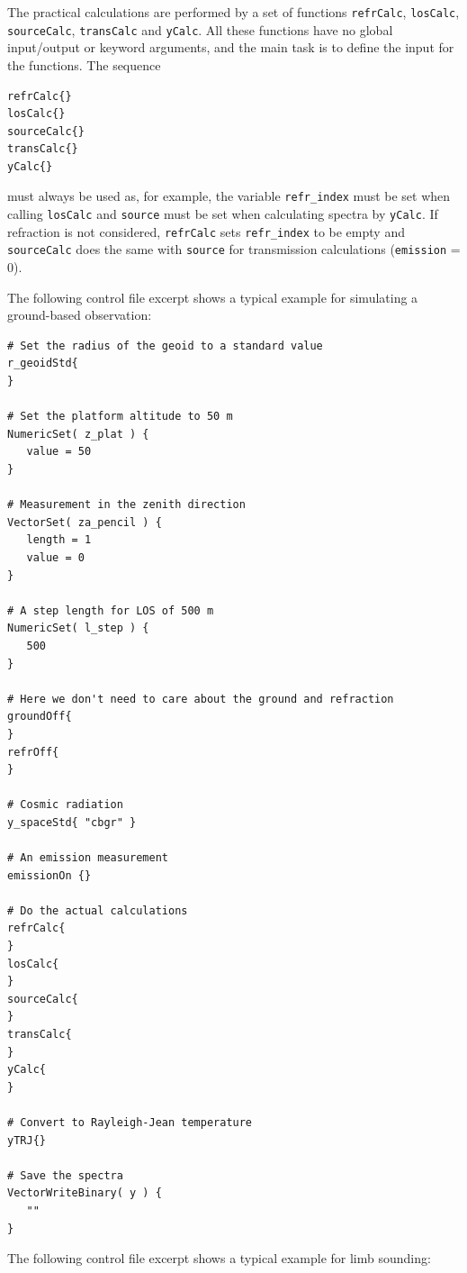  \label{sec:los:cfe}
 
 The practical calculations are performed by a set of functions
 \verb|refrCalc|, \verb|losCalc|, \verb|sourceCalc|, \verb|transCalc|
 and \verb|yCalc|. All these functions have no global input/output or
 keyword arguments, and the main task is to define the input for the
 functions. The sequence {\footnotesize \begin{verbatim}
refrCalc{}
losCalc{}
sourceCalc{}
transCalc{}
yCalc{} 
\end{verbatim} 
} 
\noindent 
must always be used as, for example, the variable \verb|refr_index|
must be set when calling \verb|losCalc| and \verb|source|
must be set when calculating spectra by \verb|yCalc|. If refraction
is not considered, \verb|refrCalc| sets \verb|refr_index| to be empty
and \verb|sourceCalc| does the same with \verb|source| for transmission
calculations (\verb|emission| = 0).



 The following control file excerpt shows a typical example for
 simulating a ground-based observation:

 {\footnotesize
 \begin{verbatim}
# Set the radius of the geoid to a standard value
r_geoidStd{
}

# Set the platform altitude to 50 m
NumericSet( z_plat ) { 
   value = 50 
}

# Measurement in the zenith direction
VectorSet( za_pencil ) {
   length = 1
   value = 0
} 

# A step length for LOS of 500 m
NumericSet( l_step ) { 
   500 
}

# Here we don't need to care about the ground and refraction
groundOff{
}
refrOff{
}

# Cosmic radiation
y_spaceStd{ "cbgr" }

# An emission measurement
emissionOn {}

# Do the actual calculations 
refrCalc{
}
losCalc{
}
sourceCalc{
}
transCalc{
}
yCalc{
}

# Convert to Rayleigh-Jean temperature
yTRJ{}

# Save the spectra
VectorWriteBinary( y ) { 
   ""
}

 \end{verbatim}
 }




 The following control file excerpt shows a typical example for
 limb sounding:

